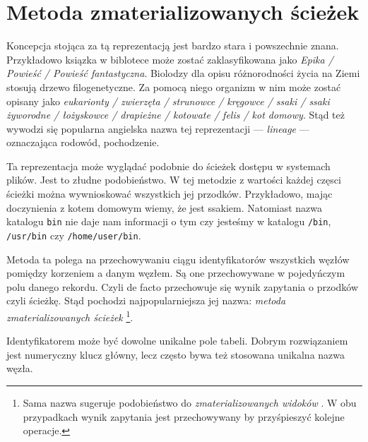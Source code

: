 \section{Metoda zmaterializowanych ścieżek}


Koncepcja stojąca za tą reprezentacją jest bardzo stara i powszechnie znana.
Przykładowo ksiązka w biblotece może zostać zaklasyfikowana jako \textit{Epika / Powieść / Powieść fantastyczna}.
Biolodzy dla opisu różnorodności życia na Ziemi stosują drzewo filogenetyczne.
Za pomocą niego organizm w nim może zostać opisany jako
\textit{eukarionty / zwierzęta / strunowce / kręgowce / ssaki / ssaki żyworodne / łożyskowce / drapieżne / kotowate / felis / kot domowy}.
Stąd też wywodzi się popularna angielska nazwa tej reprezentacji --- \textit{lineage} --- oznaczająca rodowód, pochodzenie.


    Ta reprezentacja może wyglądać podobnie do ścieżek dostępu w systemach plików.
    Jest to złudne podobieństwo.
    W tej metodzie z wartości każdej częsci ścieżki można wywnioskować wszystkich jej przodków.
    Przykładowo, mając doczynienia z kotem domowym wiemy, że jest ssakiem.
    Natomiast nazwa katalogu \texttt{bin} nie daje nam informacji o tym czy jesteśmy w katalogu \texttt{/bin}, \texttt{/usr/bin} czy \texttt{/home/user/bin}.



Metoda ta polega na przechowywaniu ciągu identyfikatorów wszystkich węzłów pomiędzy korzeniem a danym węzłem.
Są one przechowywane w pojedyńczym polu danego rekordu.
Czyli de facto przechowuje się wynik zapytania o przodków czyli ścieżkę.
Stąd pochodzi najpopularniejsza jej nazwa: \emph{metoda zmaterializowanych ścieżek} \footnote{
    Sama nazwa sugeruje podobieństwo do \emph{zmaterializowanych widoków} .
    W obu przypadkach wynik zapytania jest przechowywany by przyśpieszyć kolejne operacje.
}.


Identyfikatorem może być dowolne unikalne pole  tabeli.
Dobrym rozwiązaniem jest numeryczny klucz główny, lecz często bywa też stosowana unikalna nazwa węzła.


